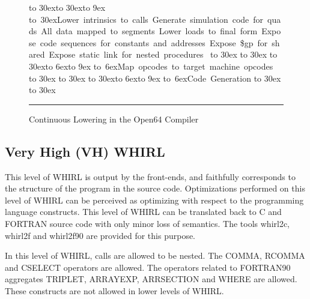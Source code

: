 \begin{figure}
{{\hbox to 30ex{\vbox to 30ex{\vfil\figdownarrow{30ex}\vfil}\hbox to 9ex{\hfil}%
\hbox{\vbox to 30ex{\vfil\hbox{Lower intrinsics to calls}
      \hbox{Generate simulation code for quads}
      \hbox{All data mapped to segments}
      \hbox{Lower loads to final form}
      \hbox{Expose code sequences for}
      \hbox{\quad{}constants and addresses}
      \hbox{Expose \$gp for shared}
      \hbox{Expose static link for nested}
      \hbox{\quad{}procedures}
      \vfil
}}\hss}
\hbox to 30ex{
%
\hbox to 30ex{\hfil{}\hfil}}
\hbox to 30ex{\vbox to 6ex{\vfil\figdownarrow{30ex}\vfil}\hbox to 9ex{\hfil}%
\hbox{\vbox to 6ex{\vfil\hbox{Map opcodes to target machine}
      \hbox{\quad{}opcodes}
      \vfil
}}\hss}
\hbox to 30ex{
%
\hbox to 30ex{\hfil{}\hfil}}
\hbox to 30ex{\vbox to 6ex{\vfil\figdownarrow{30ex}\vfil}\hbox to 9ex{\hfil}%
\hbox{\vbox to 6ex{\vfil\hbox{Code Generation}\vfil}}\hss}
\hbox to 30ex{
%
\hbox to 30ex{\hfil{}\hfil}
}}
\hfil
}

\vspace{.5in}

\hrule
\caption{Continuous Lowering in the Open64 Compiler}
\end{figure}

\subsection{Very High (VH) WHIRL}

This level of WHIRL is output by the front-ends, and faithfully
corresponds to the structure of the program in the source code.
Optimizations performed on this level of WHIRL can be perceived as optimizing
with respect to the programming language constructs. This level of
WHIRL can be translated back to C and FORTRAN source code with only
minor loss of semantics. The tools whirl2c, whirl2f and whirl2f90
are provided for this purpose. 

In this level of WHIRL, calls are
allowed to be nested. The
%
COMMA,
%
RCOMMA and
%
CSELECT operators are
allowed. The operators related to FORTRAN90 aggregates
%
TRIPLET,
%
ARRAYEXP,
%
ARRSECTION and 
%
WHERE are allowed. These constructs
are not allowed in lower levels of WHIRL.


